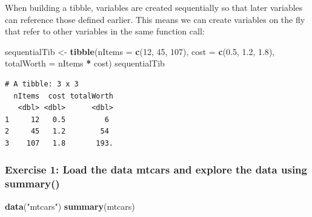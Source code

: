 \documentclass[
]{article}
\newenvironment{Shaded}{\begin{snugshade}}{\end{snugshade}}
\newcommand{\AttributeTok}[1]{\textcolor[rgb]{0.13,0.29,0.53}{#1}}
\newcommand{\DecValTok}[1]{\textcolor[rgb]{0.00,0.00,0.81}{#1}}
\newcommand{\FloatTok}[1]{\textcolor[rgb]{0.00,0.00,0.81}{#1}}
\newcommand{\FunctionTok}[1]{\textcolor[rgb]{0.13,0.29,0.53}{\textbf{#1}}}
\newcommand{\NormalTok}[1]{#1}
\newcommand{\OtherTok}[1]{\textcolor[rgb]{0.56,0.35,0.01}{#1}}
\newcommand{\SpecialCharTok}[1]{\textcolor[rgb]{0.81,0.36,0.00}{\textbf{#1}}}
\newcommand{\StringTok}[1]{\textcolor[rgb]{0.31,0.60,0.02}{#1}}
\begin{document}
When building a tibble, variables are created sequentially so that later
variables can reference those defined earlier. This means we can create
variables on the fly that refer to other variables in the same function
call:

\begin{Shaded}
\begin{Highlighting}[]
\NormalTok{sequentialTib }\OtherTok{\textless{}{-}} \FunctionTok{tibble}\NormalTok{(}\AttributeTok{nItems =} \FunctionTok{c}\NormalTok{(}\DecValTok{12}\NormalTok{, }\DecValTok{45}\NormalTok{, }\DecValTok{107}\NormalTok{),}
                        \AttributeTok{cost =} \FunctionTok{c}\NormalTok{(}\FloatTok{0.5}\NormalTok{, }\FloatTok{1.2}\NormalTok{, }\FloatTok{1.8}\NormalTok{),}
\AttributeTok{totalWorth =}\NormalTok{ nItems }\SpecialCharTok{*}\NormalTok{ cost)}
\NormalTok{sequentialTib}
\end{Highlighting}
\end{Shaded}

\begin{verbatim}
# A tibble: 3 x 3
  nItems  cost totalWorth
   <dbl> <dbl>      <dbl>
1     12   0.5         6 
2     45   1.2        54 
3    107   1.8       193.
\end{verbatim}

\subsubsection{Exercise 1: Load the data mtcars and explore the data
using
summary()}\label{exercise-1-load-the-data-mtcars-and-explore-the-data-using-summary}

\begin{Shaded}
\begin{Highlighting}[]
\FunctionTok{data}\NormalTok{(}\StringTok{"mtcars"}\NormalTok{)}
\FunctionTok{summary}\NormalTok{(mtcars)}
\end{Highlighting}
\end{Shaded}
\end{document}
